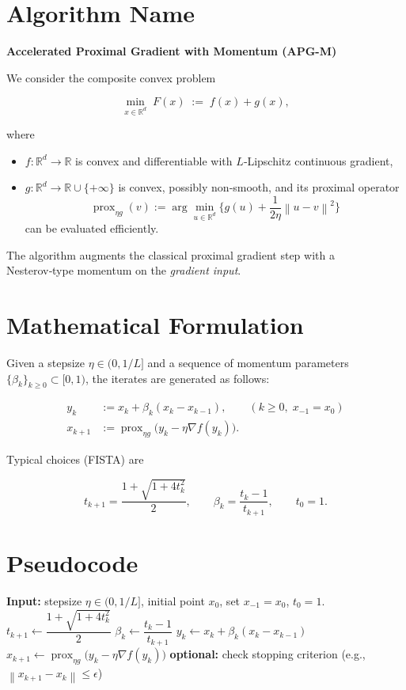 \documentclass{article}
\newcommand{\prox}{\operatorname{prox}}
\newcommand{\R}{\mathbb{R}}
\newcommand{\norm}[1]{\left\lVert#1\right\rVert}
\begin{document}
\section*{Algorithm Name}
\textbf{Accelerated Proximal Gradient with Momentum (APG-M)}  

We consider the composite convex problem  

\[
\min_{x\in\R^{d}} \; F(x)\;:=\;f(x)+g(x),
\]

where  

\begin{itemize}
  \item $f:\R^{d}\to\R$ is convex and differentiable with $L$‑Lipschitz continuous gradient,
  \item $g:\R^{d}\to\R\cup\{+\infty\}$ is convex, possibly non‑smooth, and its proximal operator
        \[
          \prox_{\eta g}(v):=\arg\min_{u\in\R^{d}}\Big\{ g(u)+\frac{1}{2\eta}\norm{u-v}^{2}\Big\}
        \]
        can be evaluated efficiently.
\end{itemize}

The algorithm augments the classical proximal gradient step with a Nesterov‑type momentum on the \emph{gradient input}.

\section*{Mathematical Formulation}
Given a stepsize $\eta\in(0,1/L]$ and a sequence of momentum parameters $\{\beta_k\}_{k\ge 0}\subset[0,1)$, the iterates are generated as follows:

\[
\boxed{
\begin{aligned}
y_k &:= x_k + \beta_k (x_k-x_{k-1}), \qquad (k\ge 0,\;x_{-1}=x_0)\\[4pt]
x_{k+1} &:= \prox_{\eta g}\!\bigl( y_k - \eta \nabla f(y_k) \bigr).
\end{aligned}}
\tag{APG-M}
\]

Typical choices (FISTA) are  

\[
t_{k+1}= \frac{1+\sqrt{1+4t_k^{2}}}{2},\qquad 
\beta_k = \frac{t_k-1}{t_{k+1}},\qquad t_0=1 .
\]

\section*{Pseudocode}
\begin{algorithm}[H]
\caption{Accelerated Proximal Gradient with Momentum (APG-M)}\label{alg:apgm}
\begin{algorithmic}[1]
\STATE \textbf{Input:} stepsize $\eta\in(0,1/L]$, initial point $x_0$, set $x_{-1}=x_0$, $t_0=1$.
    \STATE $t_{k+1}\gets \dfrac{1+\sqrt{1+4t_k^{2}}}{2}$          
    \STATE $\beta_k\gets \dfrac{t_k-1}{t_{k+1}}$                    
    \STATE $y_k \gets x_k + \beta_k (x_k-x_{k-1})$                
    \STATE $x_{k+1}\gets \prox_{\eta g}\!\bigl( y_k - \eta \nabla f(y_k) \bigr)$
    \STATE \textbf{optional:} check stopping criterion (e.g., $\norm{x_{k+1}-x_k}\le \epsilon$)
\ENDFOR
\end{algorithmic}
\end{algorithm}
\end{document}

